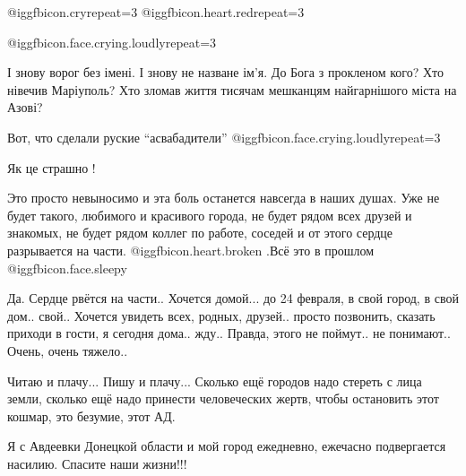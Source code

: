 \begin{itemize}
 @igg{fbicon.cry}{repeat=3} @igg{fbicon.heart.red}{repeat=3}

 @igg{fbicon.face.crying.loudly}{repeat=3} 


І знову ворог без імені. І знову не назване ім'я. До Бога з прокленом кого? Хто
нівечив Маріуполь? Хто зломав життя тисячам мешканцям найгарнішого міста на
Азові?

Вот, что сделали руские \enquote{асвабадители} @igg{fbicon.face.crying.loudly}{repeat=3} 

Як це страшно !


Это просто невыносимо и эта боль останется навсегда в наших душах. Уже не будет
такого, любимого и красивого города, не будет рядом всех друзей и знакомых, не
будет рядом коллег по работе, соседей и от этого сердце разрывается на
части. @igg{fbicon.heart.broken} .Всё это в прошлом @igg{fbicon.face.sleepy} 


Да. Сердце рвётся на части..
Хочется домой... до 24 февраля, в свой город, в свой дом.. свой..
Хочется увидеть всех, родных, друзей.. просто позвонить, сказать приходи в гости, я сегодня дома.. жду..
Правда, этого не поймут.. не понимают..
Очень, очень тяжело..


Читаю и плачу... Пишу и плачу... Сколько ещё городов надо стереть с лица земли,
сколько ещё надо принести человеческих жертв, чтобы остановить этот кошмар, это
безумие, этот АД.

Я с Авдеевки Донецкой области и мой город ежедневно, ежечасно подвергается
насилию. Спасите наши жизни!!!




\end{itemize} %
